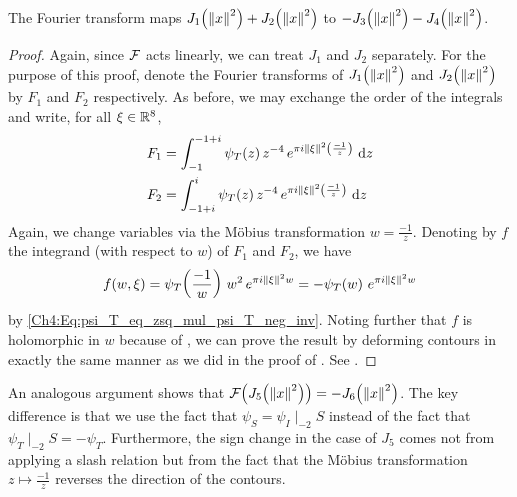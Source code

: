 \begin{boxlemma}\label{Ch4:Lemma:Fourier_J_1_add_J_2_eq_neg_J_3_sub_J_4}
    The Fourier transform maps $J_1\!\left( \left\lVert x \right\rVert^2 \right) + J_2\!\left( \left\lVert x \right\rVert^2 \right)$ to $-J_3\!\left( \left\lVert x \right\rVert^2 \right) - J_4\!\left( \left\lVert x \right\rVert^2 \right)$.
\end{boxlemma}
\begin{proof}
    Again, since $\mathcal{F}$ acts linearly, we can treat $J_1$ and $J_2$ separately. For the purpose of this proof, denote the Fourier transforms of $J_1\!\left( \left\lVert x \right\rVert^2 \right)$ and $J_2\!\left( \left\lVert x \right\rVert^2 \right)$ by $F_1$ and $F_2$ respectively. As before, we may exchange the order of the integrals and write, for all $\xi \in \mathbb{R}^8$,
    \begin{align*}
        F_1 &= \int_{-1}^{-1 + i} \psi_T(z) \, z^{-4} \, e^{\pi i \left\lVert \xi \right\rVert^2 \left( \frac{-1}{z} \right)} \, \operatorname{d}\!{z} \\
        F_2 &= \int_{-1 + i}^{i} \psi_T(z) \, z^{-4} \, e^{\pi i \left\lVert \xi \right\rVert^2 \left( \frac{-1}{z} \right)} \, \operatorname{d}\!{z}
    \end{align*}
    Again, we change variables via the Möbius transformation $w = \frac{-1}{z}$. Denoting by $f$ the integrand (with respect to $w$) of $F_1$ and $F_2$, we have
    \begin{align*}
        f\!\left( w, \xi \right)
        = \psi_T\!\left( \frac{-1}{w} \right) \, w^2 \, e^{\pi i \left\lVert \xi \right\rVert^2 w}
        = -\psi_T\!\left( w \right) \, e^{\pi i \left\lVert \xi \right\rVert^2 w}
    \end{align*}
    by \eqref{Ch4:Eq:psi_T_eq_zsq_mul_psi_T_neg_inv}. Noting further that $f$ is holomorphic in $w$ because of , we can prove the result by deforming contours in exactly the same manner as we did in the proof of . See .
\end{proof}

An analogous argument shows that $\mathcal{F}\!\left( J_5\!\left( \left\lVert x \right\rVert^2 \right) \right) = - J_6\!\left( \left\lVert x \right\rVert^2 \right)$. The key difference is that we use the fact that $\psi_S = \psi_I \mid_{-2} S$ instead of the fact that $\psi_T \mid_{-2} S = -\psi_T$. Furthermore, the sign change in the case of $J_5$ comes not from applying a slash relation but from the fact that the Möbius transformation $z \mapsto \frac{-1}{z}$ reverses the direction of the contours.